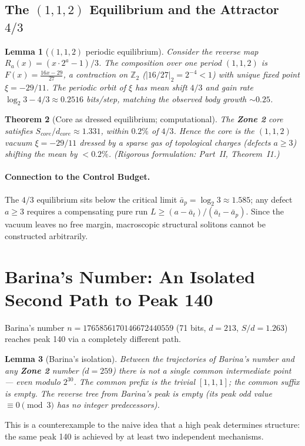 \documentclass[12pt,a4paper]{article}
\newtheorem{theorem}{Theorem}
\newtheorem{lemma}[theorem]{Lemma}
\theoremstyle{remark}
\begin{document}
\subsection{The $(1,1,2)$ Equilibrium and the Attractor $4/3$}
\begin{lemma}[$(1,1,2)$ periodic equilibrium]
Consider the reverse map $R_a(x)=(x\cdot 2^{a}-1)/3$. The composition over one period $(1,1,2)$ is $F(x)=\frac{16x-29}{27}$, a contraction on $\mathbb{Z}_2$ ($|16/27|_2=2^{-4}<1$) with unique fixed point $\xi=-29/11$. The periodic orbit of $\xi$ has mean shift $4/3$ and gain rate $\log_2 3-4/3\approx0.2516$ bits/step, matching the observed body growth $\sim0.25$.
\end{lemma}
\begin{theorem}[Core as dressed equilibrium; computational]
The \textbf{Zone 2} core satisfies $S_{core}/d_{core}\approx1.331$, within $0.2\%$ of $4/3$. Hence the core is the $(1,1,2)$ vacuum $\xi=-29/11$ dressed by a sparse gas of topological charges (defects $a\ge3$) shifting the mean by $<0.2\%$. (Rigorous formulation: Part~II, Theorem~I1.)
\end{theorem}
\paragraph{Connection to the Control Budget.}
The $4/3$ equilibrium sits below the critical limit $\bar a_p=\log_2 3\approx1.585$; any defect $a\ge3$ requires a compensating pure run $L \ge (a-\bar a_t)/(\bar a_t-\bar a_p)$. Since the vacuum leaves no free margin, macroscopic structural solitons cannot be constructed arbitrarily.

\section{Barina's Number: An Isolated Second Path to Peak 140}
Barina's number $n = 1765856170146672440559$ (71 bits, $d=213$, $S/d=1.263$) reaches peak 140 via a completely different path.
\begin{lemma}[Barina's isolation]
Between the trajectories of Barina's number and any \textbf{Zone 2} number ($d=259$) there is not a single common intermediate point --- even modulo $2^{30}$. The common prefix is the trivial $[1,1,1]$; the common suffix is empty. The reverse tree from Barina's peak is empty (its peak odd value $\equiv0\pmod3$ has no integer predecessors).
\end{lemma}
This is a counterexample to the naive idea that a high peak determines structure: the same peak 140 is achieved by at least two independent mechanisms.
\end{document}
